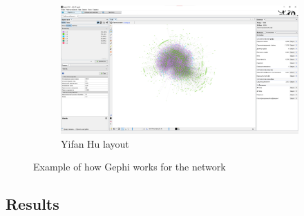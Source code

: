 \begin{enumerate}
\begin{figure}[H]
\begin{subfigure}{\textwidth}
                \centering
                \includegraphics[width=\textwidth]{img/layout_yifanhu.png}
                \caption{Yifan Hu layout}
            \end{subfigure}
            \caption{Example of how Gephi works for the network}
            \label{ris:layouts}
        \end{figure}
\end{enumerate}

\subsection{Results}\label{subsec:results}

